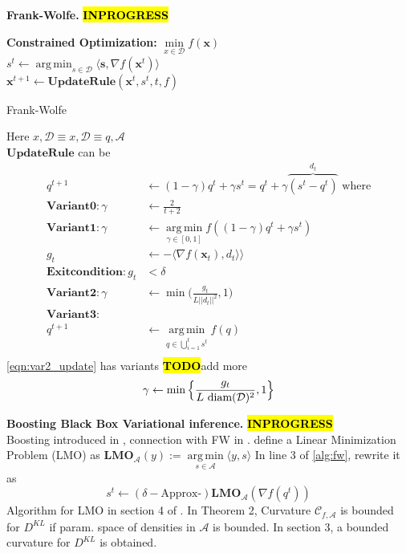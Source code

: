 \documentclass[letterpaper]{article}
\newcommand{\TODO}{\hl{\textbf{TODO}}}
\newcommand{\INPROGRESS}{\sethlcolor{cyan}\hl{\textbf{INPROGRESS}}\sethlcolor{yellow}}
\newcommand{\comment}[1]{\textcolor{OliveGreen}{#1}}
\newcommand{\red}[1]{\textcolor{BrickRed}{#1}}
\DeclareMathOperator*{\argmin}{arg\,min}
\newcommand{\bs}{\mathbf{s}}
\newcommand{\bx}{\mathbf{x}}
\newcommand{\grad}{\nabla}
\newcommand{\data}{\mathcal{D}}
\newcommand{\mypar}[1]{{\bf #1.}}
\begin{document}
  \mypar{Frank-Wolfe} \INPROGRESS
    \cite{jaggi2013revisiting} \cite{pedregosa2018frank} 
    \cite{pedregosa2018step} \cite{doi:10.1002/zamm.19730530723}
  \begin{algorithm}[h]
    \textbf{Constrained Optimization:} $\min\limits_{x \in \data} f(\bx)$ \\
     {
      $s^t \gets \argmin_{s \in \data}\langle \bs, \grad f(\bx^{t}) \rangle$ \\
      $\bx^{t + 1} \gets \mathbf{UpdateRule}(\bx^t, s^t, t, f)$
    }
  \caption{Frank-Wolfe}
  \label{alg:fw}
 \end{algorithm}
 \comment{Here $x, \mathcal{D} \equiv x, \mathcal{D} \equiv q, \mathcal{A}$}\\
 $\mathbf{UpdateRule}$ can be
 \begin{align}
   q^{t + 1} &\gets (1 - \gamma) q^t + \gamma s^t = q^t + \gamma\overbrace{(s^t - q^t)}^{d_t} 
 \textrm{ where}\nonumber\\
 \mathbf{Variant 0:} 
   \gamma &\gets \frac{2}{t + 2} \\
 \mathbf{Variant 1:}
   \gamma &\gets \argmin\limits_{\gamma \in [0, 1]} f((1 - \gamma) q^t + \gamma s^t)
    \label{eqn:update_lsearch} \\
  g_t &\gets -\langle \grad f(\bx_t), d_t \rangle \rangle \nonumber\\
 \mathbf{Exit condition:} g_t &< \delta \nonumber\\
 \mathbf{Variant 2:} \gamma &\gets \min \Big(\frac{g_t}{L ||d_t|| ^2}, 1\Big)
 \label{eqn:var2_update} \\
 \mathbf{Variant 3:} \nonumber\\
   q^{t + 1} &\gets \argmin\limits_{q \in \bigcup_{i=1}^{t}{s^t}}f(q) \nonumber\\
 \end{align}
 \ref{eqn:var2_update} has variants \cite{pedregosa2018frank} \cite{Demyanov70} \TODO add more
 \red{$$
 \gamma \gets \min \Big\{\frac{g_t}{L\text{ diam}(\data) ^2}, 1\Big\}
 \label{eqn:var2b} \\
 $$}

  \mypar{Boosting Black Box Variational inference} \INPROGRESS \\
  Boosting introduced in \cite{guo2016boosting}, connection with FW in \cite{locatello2017boosting}.
  define a Linear Minimization Problem (LMO) as
  $
  \mathbf{LMO}_{\mathcal{A}}(y) := \argmin\limits_{s \in \mathcal{A}} \langle y, s \rangle
  $
  In line 3 of \ref{alg:fw}, rewrite it as
  $$
  s^t \gets (\delta-\text{Approx-})\mathbf{LMO}_{\mathcal{A}}(\grad f(q^t))
  $$
  Algorithm for LMO in section 4 of \cite{locatello2018boosting}. In Theorem 2,
  Curvature $\mathcal{C}_{f,\mathcal{A}}$ is bounded for $D^{KL}$ if param. space of
  densities in $\mathcal{A}$ is bounded. In section 3, a bounded curvature for
   $D^{KL}$ is obtained.
   
\end{document}
